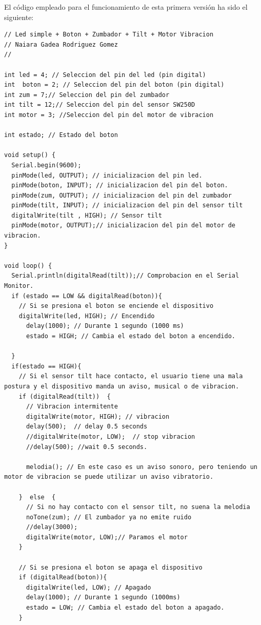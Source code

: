 \newpage
El código empleado para el funcionamiento de esta primera versión ha sido el siguiente:
\begin{lstlisting}
// Led simple + Boton + Zumbador + Tilt + Motor Vibracion
// Naiara Gadea Rodriguez Gomez
// 

int led = 4; // Seleccion del pin del led (pin digital)
int  boton = 2; // Seleccion del pin del boton (pin digital)
int zum = 7;// Seleccion del pin del zumbador
int tilt = 12;// Seleccion del pin del sensor SW250D
int motor = 3; //Seleccion del pin del motor de vibracion

int estado; // Estado del boton

void setup() {
  Serial.begin(9600);
  pinMode(led, OUTPUT); // inicializacion del pin led.
  pinMode(boton, INPUT); // inicializacion del pin del boton.
  pinMode(zum, OUTPUT); // inicializacion del pin del zumbador
  pinMode(tilt, INPUT); // inicializacion del pin del sensor tilt
  digitalWrite(tilt , HIGH); // Sensor tilt 
  pinMode(motor, OUTPUT);// inicializacion del pin del motor de vibracion.
}

void loop() {
  Serial.println(digitalRead(tilt));// Comprobacion en el Serial Monitor.
  if (estado == LOW && digitalRead(boton)){
    // Si se presiona el boton se enciende el dispositivo
    digitalWrite(led, HIGH); // Encendido
      delay(1000); // Durante 1 segundo (1000 ms)
      estado = HIGH; // Cambia el estado del boton a encendido.
    
  }
  if(estado == HIGH){
    // Si el sensor tilt hace contacto, el usuario tiene una mala postura y el dispositivo manda un aviso, musical o de vibracion.
    if (digitalRead(tilt))  {
      // Vibracion intermitente
      digitalWrite(motor, HIGH); // vibracion
      delay(500);  // delay 0.5 seconds
      //digitalWrite(motor, LOW);  // stop vibracion
      //delay(500); //wait 0.5 seconds.
      
      melodia(); // En este caso es un aviso sonoro, pero teniendo un motor de vibracion se puede utilizar un aviso vibratorio.
      
    }  else  {
      // Si no hay contacto con el sensor tilt, no suena la melodia
      noTone(zum); // El zumbador ya no emite ruido
      //delay(3000);
      digitalWrite(motor, LOW);// Paramos el motor
    }

    // Si se presiona el boton se apaga el dispositivo
    if (digitalRead(boton)){
      digitalWrite(led, LOW); // Apagado
      delay(1000); // Durante 1 segundo (1000ms)
      estado = LOW; // Cambia el estado del boton a apagado.
    }
    

\end{lstlisting}

